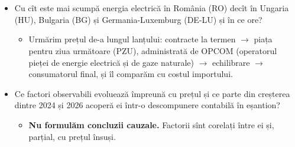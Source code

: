 \section{}
\begin{itemize}
\item {}%
{Cu cît este mai scumpă energia electrică în România (RO) decît în Ungaria (HU), Bulgaria (BG) și Germania-Luxemburg (DE-LU) și în ce ore?}
  \begin{itemize}
  \item {}%
  {Urmărim prețul de-a lungul lanțului: contracte la termen $\to$ piața pentru ziua următoare (PZU), administrată de OPCOM (operatorul pieței de energie electrică și de gaze naturale) $\to$ echilibrare $\to$ consumatorul final, și îl comparăm cu costul importului.}
  \end{itemize}
\item {}%
{Ce factori observabili evoluează împreună cu prețul și ce parte din creșterea dintre 2024 și 2026 acoperă ei într-o descompunere contabilă în eșantion?}
  \begin{itemize}
  \item {}%
  {\textbf{Nu formulăm concluzii cauzale.} Factorii sînt corelați între ei și, parțial, cu prețul însuși.}
  \end{itemize}
\end{itemize}


